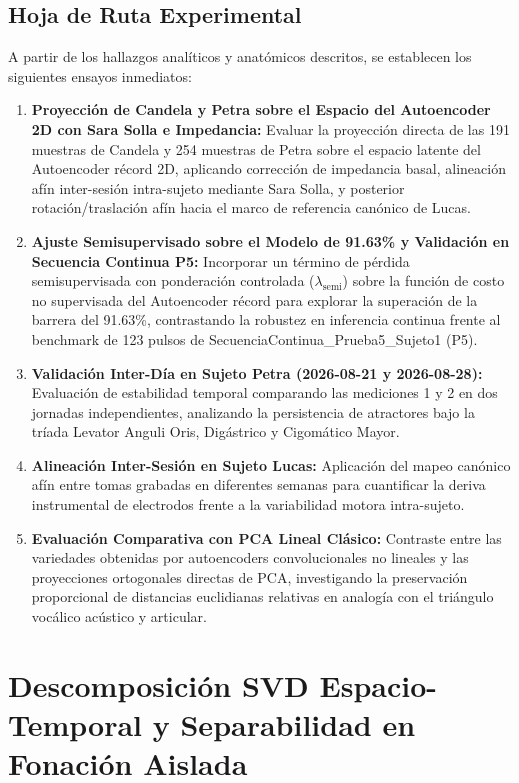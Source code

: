 \documentclass[11pt,a4paper,openany]{book}
\theoremstyle{definition}
\begin{document}
\subsection{Hoja de Ruta Experimental}
\label{subsec:hoja_ruta_futura}

A partir de los hallazgos analíticos y anatómicos descritos, se establecen los siguientes ensayos inmediatos:
\begin{enumerate}
    \item \textbf{Proyección de Candela y Petra sobre el Espacio del Autoencoder 2D con Sara Solla e Impedancia:} Evaluar la proyección directa de las 191 muestras de Candela y 254 muestras de Petra sobre el espacio latente del Autoencoder récord 2D, aplicando corrección de impedancia basal, alineación afín inter-sesión intra-sujeto mediante Sara Solla, y posterior rotación/traslación afín hacia el marco de referencia canónico de Lucas.
    \item \textbf{Ajuste Semisupervisado sobre el Modelo de 91.63\% y Validación en Secuencia Continua P5:} Incorporar un término de pérdida semisupervisada con ponderación controlada ($\lambda_{\text{semi}}$) sobre la función de costo no supervisada del Autoencoder récord para explorar la superación de la barrera del 91.63\%, contrastando la robustez en inferencia continua frente al benchmark de 123 pulsos de SecuenciaContinua\_Prueba5\_Sujeto1 (P5).
    \item \textbf{Validación Inter-Día en Sujeto Petra (2026-08-21 y 2026-08-28):} Evaluación de estabilidad temporal comparando las mediciones 1 y 2 en dos jornadas independientes, analizando la persistencia de atractores bajo la tríada Levator Anguli Oris, Digástrico y Cigomático Mayor.
    \item \textbf{Alineación Inter-Sesión en Sujeto Lucas:} Aplicación del mapeo canónico afín entre tomas grabadas en diferentes semanas para cuantificar la deriva instrumental de electrodos frente a la variabilidad motora intra-sujeto.
    \item \textbf{Evaluación Comparativa con PCA Lineal Clásico:} Contraste entre las variedades obtenidas por autoencoders convolucionales no lineales y las proyecciones ortogonales directas de PCA, investigando la preservación proporcional de distancias euclidianas relativas en analogía con el triángulo vocálico acústico y articular.
\end{enumerate}

\section{Descomposición SVD Espacio-Temporal y Separabilidad en Fonación Aislada}
\label{sec:svd_espaciotemporal_separabilidad}
\end{document}
